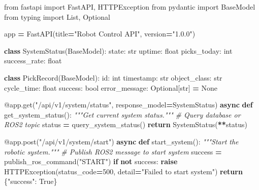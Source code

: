 \documentclass[
]{article}
\newenvironment{Shaded}{\begin{snugshade}}{\end{snugshade}}
\newcommand{\AttributeTok}[1]{\textcolor[rgb]{0.13,0.29,0.53}{#1}}
\newcommand{\BuiltInTok}[1]{#1}
\newcommand{\CommentTok}[1]{\textcolor[rgb]{0.56,0.35,0.01}{\textit{#1}}}
\newcommand{\ControlFlowTok}[1]{\textcolor[rgb]{0.13,0.29,0.53}{\textbf{#1}}}
\newcommand{\DecValTok}[1]{\textcolor[rgb]{0.00,0.00,0.81}{#1}}
\newcommand{\ImportTok}[1]{#1}
\newcommand{\KeywordTok}[1]{\textcolor[rgb]{0.13,0.29,0.53}{\textbf{#1}}}
\newcommand{\NormalTok}[1]{#1}
\newcommand{\OperatorTok}[1]{\textcolor[rgb]{0.81,0.36,0.00}{\textbf{#1}}}
\newcommand{\StringTok}[1]{\textcolor[rgb]{0.31,0.60,0.02}{#1}}
\newcommand{\VariableTok}[1]{\textcolor[rgb]{0.00,0.00,0.00}{#1}}
\begin{document}
\begin{Shaded}
\begin{Highlighting}[]
\ImportTok{from}\NormalTok{ fastapi }\ImportTok{import}\NormalTok{ FastAPI, HTTPException}
\ImportTok{from}\NormalTok{ pydantic }\ImportTok{import}\NormalTok{ BaseModel}
\ImportTok{from}\NormalTok{ typing }\ImportTok{import}\NormalTok{ List, Optional}

\NormalTok{app }\OperatorTok{=}\NormalTok{ FastAPI(title}\OperatorTok{=}\StringTok{"Robot Control API"}\NormalTok{, version}\OperatorTok{=}\StringTok{"1.0.0"}\NormalTok{)}

\KeywordTok{class}\NormalTok{ SystemStatus(BaseModel):}
\NormalTok{    state: }\BuiltInTok{str}
\NormalTok{    uptime: }\BuiltInTok{float}
\NormalTok{    picks\_today: }\BuiltInTok{int}
\NormalTok{    success\_rate: }\BuiltInTok{float}

\KeywordTok{class}\NormalTok{ PickRecord(BaseModel):}
    \BuiltInTok{id}\NormalTok{: }\BuiltInTok{int}
\NormalTok{    timestamp: }\BuiltInTok{str}
\NormalTok{    object\_class: }\BuiltInTok{str}
\NormalTok{    cycle\_time: }\BuiltInTok{float}
\NormalTok{    success: }\BuiltInTok{bool}
\NormalTok{    error\_message: Optional[}\BuiltInTok{str}\NormalTok{] }\OperatorTok{=} \VariableTok{None}

\AttributeTok{@app.get}\NormalTok{(}\StringTok{"/api/v1/system/status"}\NormalTok{, response\_model}\OperatorTok{=}\NormalTok{SystemStatus)}
\ControlFlowTok{async} \KeywordTok{def}\NormalTok{ get\_system\_status():}
    \CommentTok{"""Get current system status."""}
    \CommentTok{\# Query database or ROS2 topic}
\NormalTok{    status }\OperatorTok{=}\NormalTok{ query\_system\_status()}
    \ControlFlowTok{return}\NormalTok{ SystemStatus(}\OperatorTok{**}\NormalTok{status)}

\AttributeTok{@app.post}\NormalTok{(}\StringTok{"/api/v1/system/start"}\NormalTok{)}
\ControlFlowTok{async} \KeywordTok{def}\NormalTok{ start\_system():}
    \CommentTok{"""Start the robotic system."""}
    \CommentTok{\# Publish ROS2 message to start system}
\NormalTok{    success }\OperatorTok{=}\NormalTok{ publish\_ros\_command(}\StringTok{"START"}\NormalTok{)}
    \ControlFlowTok{if} \KeywordTok{not}\NormalTok{ success:}
        \ControlFlowTok{raise}\NormalTok{ HTTPException(status\_code}\OperatorTok{=}\DecValTok{500}\NormalTok{, detail}\OperatorTok{=}\StringTok{"Failed to start system"}\NormalTok{)}
    \ControlFlowTok{return}\NormalTok{ \{}\StringTok{"success"}\NormalTok{: }\VariableTok{True}\NormalTok{\}}


\end{Highlighting}
\end{Shaded}
\end{document}

